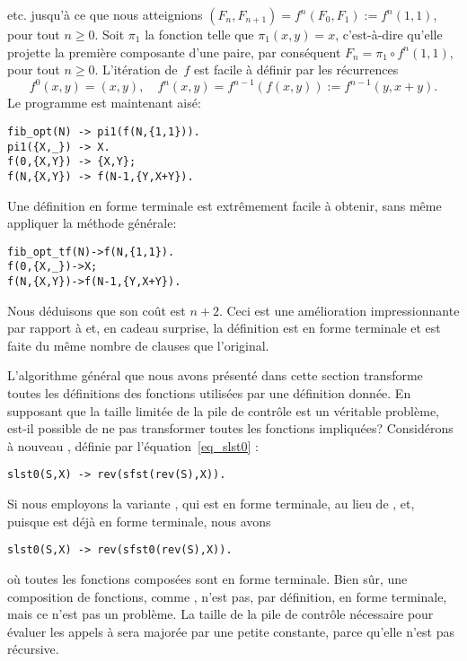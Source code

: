 etc. jusqu'à ce que nous atteignions \((F_{n},F_{n+1}) = f^n(F_0,F_1)
:= f^{n}(1,1)\), pour tout \(n \geqslant 0\). Soit \(\pi_1\) la
fonction telle que \(\pi_1(x,y) = x\), c'est-à-dire qu'elle projette
la première composante d'une paire, par conséquent \(F_n = \pi_1 \circ
f^n(1,1)\), pour tout \(n \geqslant 0\). L'itération de~\(f\) est
facile à définir par les récurrences
\begin{equation*}
f^0(x,y) = (x,y),\quad
f^n(x,y) = f^{n-1}(f(x,y)) := f^{n-1}(y,x+y).
\end{equation*}
Le programme \Erlang est maintenant aisé:
\begin{verbatim}
fib_opt(N) -> pi1(f(N,{1,1})).
pi1({X,_}) -> X.
f(0,{X,Y}) -> {X,Y};
f(N,{X,Y}) -> f(N-1,{Y,X+Y}).
\end{verbatim}
Une définition en forme terminale est extrêmement facile à obtenir,
sans même appliquer la méthode générale:
\begin{alltt}
fib\_opt\_tf(N) -> f(N,\{1,1\}).
f(0,\{X,\_\})    -> X;\hfill% \emph{Projection ici}
f(N,\{X,Y\})    -> f(N-1,\{Y,X+Y\}).
\end{alltt}
Nous déduisons que son coût est \(n + 2\). Ceci est une amélioration
impressionnante par rapport à  et, en cadeau surprise,
la définition est en forme terminale et est faite du même nombre de
clauses que l'original.

L'algorithme général que nous avons présenté dans cette section
transforme toutes les définitions des fonctions utilisées par une
définition donnée. En supposant que la taille limitée de la pile de
contrôle est un véritable problème, est-il possible de ne pas
transformer toutes les fonctions impliquées? Considérons à nouveau
, définie par l'équation~\eqref{eq_slst0}
:
\begin{verbatim}
slst0(S,X) -> rev(sfst(rev(S),X)).
\end{verbatim}
Si nous employons la variante , qui est en forme
terminale, au lieu de , et, puisque 
est déjà en forme terminale, nous avons
\begin{verbatim}
slst0(S,X) -> rev(sfst0(rev(S),X)).
\end{verbatim}
où toutes les fonctions composées sont en forme terminale. Bien sûr,
une composition de fonctions, comme , n'est pas, par
définition, en forme terminale, mais ce n'est pas un problème. La
taille de la pile de contrôle nécessaire pour évaluer les appels à 
 sera majorée par une petite constante, parce qu'elle
n'est pas récursive.


